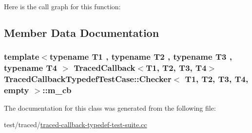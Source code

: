 Here is the call graph for this function\+:




\subsection{Member Data Documentation}
\subsubsection[{\texorpdfstring{m\+\_\+cb}{m_cb}}]{\setlength{\rightskip}{0pt plus 5cm}template$<$typename T1 , typename T2 , typename T3 , typename T4 $>$ {\bf Traced\+Callback}$<$T1, T2, T3, T4$>$ {\bf Traced\+Callback\+Typedef\+Test\+Case\+::\+Checker}$<$ T1, T2, T3, T4, {\bf empty} $>$\+::m\+\_\+cb\hspace{0.3cm}{\ttfamily [private]}}\hypertarget{classTracedCallbackTypedefTestCase_1_1Checker_3_01T1_00_01T2_00_01T3_00_01T4_00_01empty_01_4_ac39d786aff88e7c692fe94fd5c3718a0}{}\label{classTracedCallbackTypedefTestCase_1_1Checker_3_01T1_00_01T2_00_01T3_00_01T4_00_01empty_01_4_ac39d786aff88e7c692fe94fd5c3718a0}


The documentation for this class was generated from the following file\+:\begin{DoxyCompactItemize}
\item 
test/traced/\hyperlink{traced-callback-typedef-test-suite_8cc}{traced-\/callback-\/typedef-\/test-\/suite.\+cc}\end{DoxyCompactItemize}
